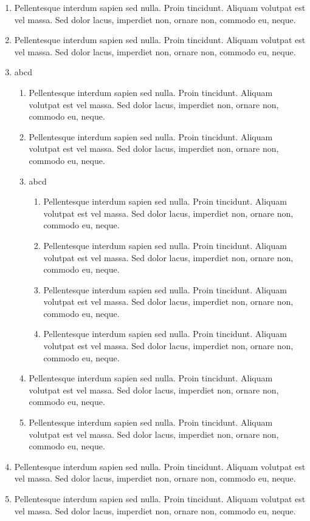 \documentclass[ngerman]{scrartcl}
\begin{document}
	\begin{enumerate}
		\item Pellentesque interdum sapien sed nulla. Proin tincidunt. Aliquam volutpat est vel massa. Sed
dolor lacus, imperdiet non, ornare non, commodo eu, neque.
		\item Pellentesque interdum sapien sed nulla. Proin tincidunt. Aliquam volutpat est vel massa. Sed
dolor lacus, imperdiet non, ornare non, commodo eu, neque.
		\item abcd
			\begin{enumerate}
				\item Pellentesque interdum sapien sed nulla. Proin tincidunt. Aliquam volutpat est vel massa. Sed
dolor lacus, imperdiet non, ornare non, commodo eu, neque.
				\item Pellentesque interdum sapien sed nulla. Proin tincidunt. Aliquam volutpat est vel massa. Sed
dolor lacus, imperdiet non, ornare non, commodo eu, neque.
				\item abcd
					\begin{enumerate}
						\item Pellentesque interdum sapien sed nulla. Proin tincidunt. Aliquam volutpat est vel massa. Sed
dolor lacus, imperdiet non, ornare non, commodo eu, neque.
						\item Pellentesque interdum sapien sed nulla. Proin tincidunt. Aliquam volutpat est vel massa. Sed
dolor lacus, imperdiet non, ornare non, commodo eu, neque.
						\item Pellentesque interdum sapien sed nulla. Proin tincidunt. Aliquam volutpat est vel massa. Sed
dolor lacus, imperdiet non, ornare non, commodo eu, neque.
						\item Pellentesque interdum sapien sed nulla. Proin tincidunt. Aliquam volutpat est vel massa. Sed
dolor lacus, imperdiet non, ornare non, commodo eu, neque.
					\end{enumerate}
				\item Pellentesque interdum sapien sed nulla. Proin tincidunt. Aliquam volutpat est vel massa. Sed
dolor lacus, imperdiet non, ornare non, commodo eu, neque.
				\item Pellentesque interdum sapien sed nulla. Proin tincidunt. Aliquam volutpat est vel massa. Sed
dolor lacus, imperdiet non, ornare non, commodo eu, neque.
			\end{enumerate}
		\item Pellentesque interdum sapien sed nulla. Proin tincidunt. Aliquam volutpat est vel massa. Sed
dolor lacus, imperdiet non, ornare non, commodo eu, neque.
		\item Pellentesque interdum sapien sed nulla. Proin tincidunt. Aliquam volutpat est vel massa. Sed
dolor lacus, imperdiet non, ornare non, commodo eu, neque.
	\end{enumerate}
\end{document}
